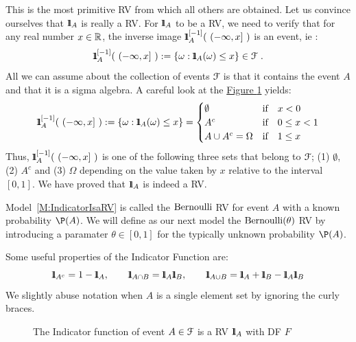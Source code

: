 \begin{model}\label{M:IndicatorIsaRV}
This is the most primitive RV from which all others are obtained. 
Let us convince ourselves that ${1}\mspace{-11 mu}{1}_A$ is really a RV.  For ${1}\mspace{-11 mu}{1}_A$ to be a RV, we need to verify that 
for any real number $x \in \mathbb{R}$, the inverse image $\BB{1}_A^{[-1]}( \ (- \infty, x] \ )$ is an event, ie :
\[
{1}\mspace{-11 mu}{1}_A^{[-1]}( \ (- \infty, x] \ ) := \{\omega: {1}\mspace{-11 mu}{1}_A(\omega) \leq x\} \in \mathcal{F} \ .
\] 
All we can assume about the collection of events $\mathcal{F}$ is that it contains the event $A$ and that it is a sigma algebra.  A careful look at the \hyperref[F:RVIndic]{Figure \ref*{F:RVIndic}} yields:
\begin{equation}
{1}\mspace{-11 mu}{1}_A^{[-1]}( \ (- \infty, x] \ ) := \{\omega: {1}\mspace{-11 mu}{1}_A(\omega) \leq x\} =
\begin{cases}
\emptyset & \text{if} \quad x < 0 \notag \\
A^c       & \text{if} \quad 0 \leq x < 1 \notag \\
A \cup A^c  = \Omega   & \text{if} \quad 1 \leq x  \notag 
\end{cases}
\end{equation}
Thus, $\BB{1}_A^{[-1]}( \ (- \infty, x] \ )$ is one of the following three sets that belong to $\mathcal{F}$; (1) $\emptyset$, (2) $A^c$ and (3) $\Omega$ depending on the value taken by $x$ relative to the interval $[0,1]$.  We have proved that ${1}\mspace{-11 mu}{1}_A$ is indeed a RV.

Model~\ref{M:IndicatorIsaRV} is called the $\mbox{{\rm Bernoulli}}$ RV for event $A$ with a known probability $\P(A)$. We will define as our next model the $\mbox{{\rm Bernoulli}}(\theta)$ RV by introducing a paramater $\theta \in [0,1]$ for the typically unknown probability $\P(A)$. 
\end{model}

Some useful properties of the Indicator Function are:
\[
\BB{1}_{A^c} = 1 - \BB{1}_A, \qquad \BB{1}_{A \cap B} = \BB{1}_A \BB{1}_B, \qquad \BB{1}_{A \cup B} = \BB{1}_A + \BB{1}_B - \BB{1}_A \BB{1}_B
\]
We slightly abuse notation when $A$ is a single element set by ignoring the curly braces.

\begin{figure}[htpb]
\caption{The Indicator function of event $A \in \mathcal{F}$ is a RV ${1}\mspace{-11 mu}{1}_A$ with DF $F$ \label{F:RVIndic}}
\centering   {}
\end{figure}

